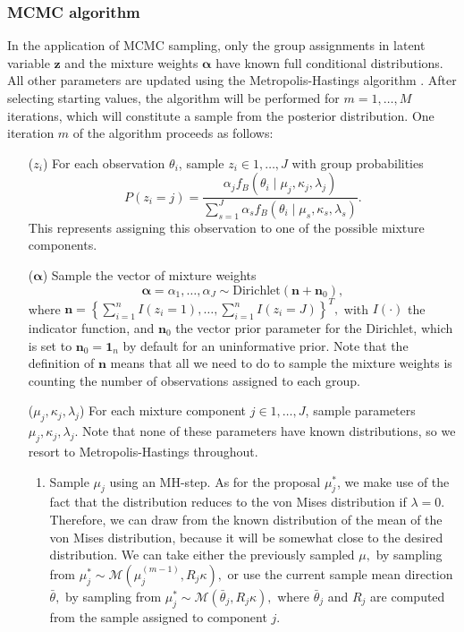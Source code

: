 \subsubsection{MCMC algorithm}
\label{subsub:mcmc}

In the application of MCMC sampling, only the group assignments in latent variable \(\boldsymbol{z}\) and the mixture weights \(\boldsymbol\alpha\) have known full conditional distributions. All other parameters are updated using the Metropolis-Hastings algorithm \citep{metropolis1953equation, hastings1970monte}. After selecting starting values, the algorithm will be performed for \(m = 1,\dots, M\) iterations, which will constitute a sample from the posterior distribution. One iteration \(m\) of the algorithm proceeds as follows:

\begin{enumerate}

\item[(\(z_i\))]  For each observation $\theta_i$, sample $z_i\in 1, \dots, J$ with group probabilities $$P(z_i = j) = \frac{\alpha_j f_B(\theta_i \mid \mu_j, \kappa_j, \lambda_j)}{\sum_{s=1}^J \alpha_s f_B(\theta_i \mid \mu_s, \kappa_s, \lambda_s)}.$$ This represents assigning this observation to one of the possible mixture components.

\item[(\(\boldsymbol{\alpha}\))] Sample the vector of mixture weights $$\boldsymbol{\alpha} = \alpha_1, \dots, \alpha_J \sim \text{Dirichlet}(\boldsymbol{n} + \boldsymbol{n}_0),$$ where \(\boldsymbol{n} = \left\{\sum_{i = 1}^n I(z_i = 1), \dots, \sum_{i = 1}^n I(z_i = J)\right\}^T,\) with $I(\cdot)$ the indicator function, and $\boldsymbol{n}_0$ the vector prior parameter for the Dirichlet, which is set to  $\boldsymbol{n}_0 = \boldsymbol{1}_n$ by default for an uninformative prior. Note that the definition of $\boldsymbol{n}$ means that all we need to do to sample the mixture weights is counting the number of observations assigned to each group.

\item[(\(\mu_j, \kappa_j, \lambda_j\))] For each mixture component $j\in 1, \dots, J$, sample parameters $\mu_j, \kappa_j, \lambda_j.$ Note that none of these parameters have known distributions, so we resort to Metropolis-Hastings throughout.

\begin{enumerate}
    \item Sample $\mu_j$ using an MH-step. As for the proposal $\mu_j^\ast$, we make use of the fact that the distribution reduces to the von Mises distribution if $\lambda = 0$. Therefore, we can draw from the known distribution of the mean of the von Mises distribution, because it will be somewhat close to the desired distribution. We can take either the previously sampled $\mu,$ by sampling from $\mu_j^\ast \sim \mathcal{M}\left(\mu_j^{(m - 1)}, R_j \kappa\right),$ or use the current sample mean direction $\bar{\theta},$ by sampling from $\mu_j^\ast \sim \mathcal{M}\left(\bar{\theta}_j, R_j \kappa\right),$ where $\bar{\theta}_j$ and $R_j$ are computed from the sample assigned to component $j$.


\end{enumerate}
\end{enumerate}
